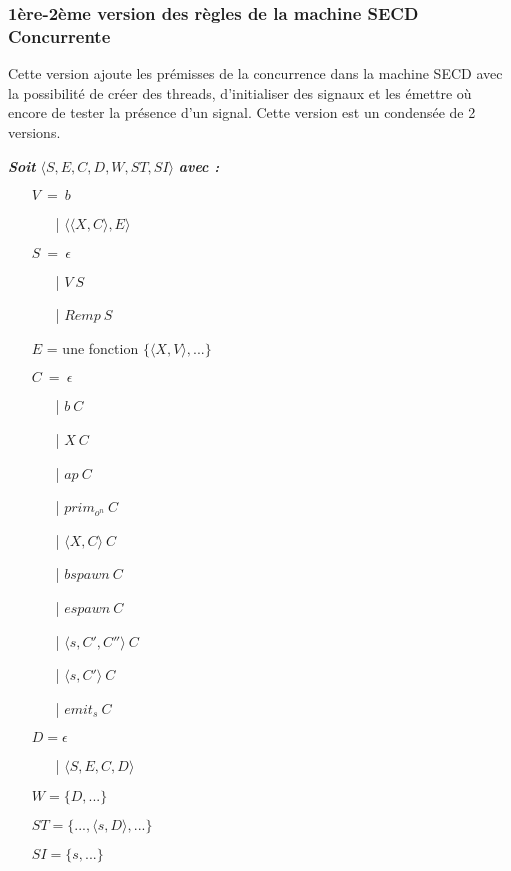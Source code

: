 \documentclass[10pt,a4paper]{report}
\begin{document}
\subsubsection{1ère-2ème version des règles de la machine SECD Concurrente}\label{SECDConc1-2}
\smallbreak
Cette version ajoute les prémisses de la concurrence dans la machine SECD avec la possibilité de créer des threads, d'initialiser des signaux et les émettre où encore de tester la présence d'un signal. Cette version est un condensée de 2 versions.
\bigbreak

\textbf{\textit{Soit}} $\langle S,E,C,D,W,ST,SI\rangle$ \textbf{\textit{avec :}}


\begin{itemize}
\item[] $V~=~b$
  \begin{itemize}
  \item[|] $\langle\langle X,C\rangle,E\rangle$
  \end{itemize}
\item[] $S~=~\epsilon$ 
  \begin{itemize}
  \item[|] $V~S$ 
  \item[|] $Remp~S$
  \end{itemize}
\item[] $E$ = une fonction $\{\langle X,V\rangle,...\}$
\item[] $C~=~\epsilon$ 
  \begin{itemize}
  \item[|] $b~C$
  \item[|] $X~C$
  \item[|] $ap~C$
  \item[|] $prim_{o^{n}}~C$  
  \item[|] $\langle X,C\rangle~C$
  \item[|] $bspawn~C$ 
  \item[|] $espawn~C$
  \item[|] $\langle s,C',C''\rangle~C$
  \item[|] $\langle s,C'\rangle~C$ 
  \item[|] $emit_{s}~C$ 
  \end{itemize}
\item[] $D = \epsilon$
  \begin{itemize}
  \item[|] $\langle S,E,C,D\rangle$ 
  \end{itemize}
\item[] $W = \{D,...\}$
\item[] $ST = \{...,\langle s,D\rangle,...\}$
\item[] $SI = \{ s,...\}$
\end{itemize}
\bigbreak
\bigbreak
\end{document}
